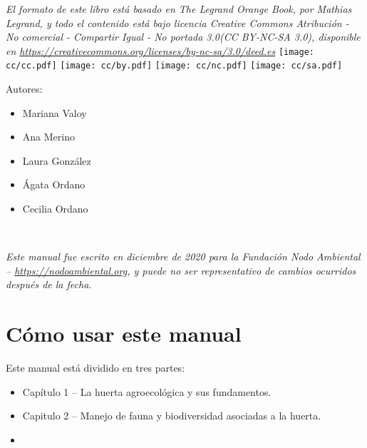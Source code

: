 \documentclass[../main.tex]{subfiles}
\begin{document}
\rule{0pt}{\textheight}
\newpage
\rule{0pt}{\textheight}
\parbox[b]{0.85\textwidth}{
    \centering
    \emph{El formato de este libro está basado en The Legrand Orange Book, por Mathias Legrand, y todo el contenido está bajo licencia Creative Commons Atribución - No comercial - Compartir Igual - No portada 3.0(CC BY-NC-SA 3.0), disponible en \emph{\url{https://creativecommons.org/licenses/by-nc-sa/3.0/deed.es}}}
       \texttt{[image: cc/cc.pdf]} 
       \texttt{[image: cc/by.pdf]} 
       \texttt{[image: cc/nc.pdf]} 
       \texttt{[image: cc/sa.pdf]} 
    \vspace{0.5\textheight}
    \vfill 

    \itemizePlainStyle
    \itshape
    \raggedright
    Autores:
    \begin{itemize}
        \item Mariana Valoy
        \item Ana Merino
        \item Laura González 
        \item Ágata Ordano
        \item Cecilia Ordano
    \end{itemize}\hfill\\[3cm]
    \normalfont
    \restoreItemizeStyle
    \centering

    \vfill 
    \emph{Este manual fue escrito en diciembre de 2020 para la Fundación Nodo Ambiental -- \emph{\url{https://nodoambiental.org}}, y puede no ser representativo de cambios ocurridos después de la fecha.}
}
\rule{0pt}{\textheight}

\thispagestyle{empty}
\pagebreak

\tableofcontents

\chapter*{Cómo usar este manual}

Este manual está dividido en tres partes:

\begin{itemize}
    \item Capítulo 1 -- La huerta agroecológica y sus fundamentos.
    \item Capitulo 2 -- Manejo de fauna y biodiversidad asociadas a la huerta.
    \item \color{black!25}{Capítulo 3 -- El compostaje.} 
\end{itemize}
\end{document}
